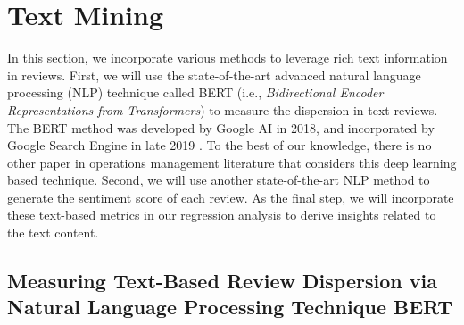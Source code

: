 \documentclass[msom,blindrev]{informs3}
\begin{document}
	
\section{Text Mining}\label{Sec: TextMining}

	
	In this section, we incorporate various methods to leverage rich text information in reviews.  First, we will use the state-of-the-art advanced natural language processing (NLP) technique called BERT (i.e., \textit{Bidirectional Encoder Representations from Transformers}) to measure the dispersion in text reviews. The BERT method was developed by Google AI in 2018, and incorporated by  Google Search Engine in late 2019 \citep{devlin2018bert,BERT}. To the best of our knowledge, there is no other paper in operations management literature that considers this deep learning based technique. Second, we will use another state-of-the-art NLP method to generate the sentiment score of each review. As the final step, we will incorporate these text-based metrics in our regression analysis to derive insights related to the text content.
	
\subsection{Measuring Text-Based Review Dispersion via Natural Language Processing Technique BERT} \label{Subsec: Define Txt Ent}
	
\end{document}
